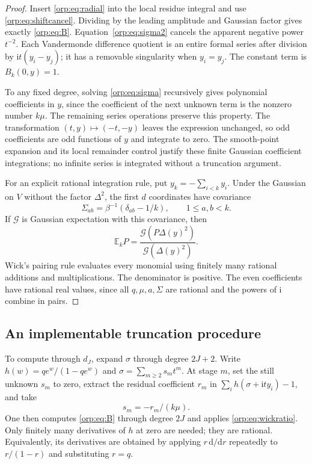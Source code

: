 \documentclass[11pt]{article}
\theoremstyle{remark}\newtheorem{remark}[theorem]{Remark}
\newcommand{\E}{\mathbb E}
\newcommand{\ii}{\mathrm i}
\begin{document}
\begin{proof}
Insert \eqref{orp:eq:radial} into the local residue integral and use \eqref{orp:eq:shiftcancel}. Dividing by the leading amplitude and Gaussian factor gives exactly \eqref{orp:eq:B}. Equation~\eqref{orp:eq:sigma2} cancels the apparent negative power $t^{-2}$. Each Vandermonde difference quotient is an entire formal series after division by $\ii t(y_i-y_j)$; it has a removable singularity when $y_i=y_j$. The constant term is $B_k(0,y)=1$.

To any fixed degree, solving \eqref{orp:eq:sigma} recursively gives polynomial coefficients in $y$, since the coefficient of the next unknown term is the nonzero number $k\mu$. The remaining series operations preserve this property. The transformation $(t,y)\mapsto(-t,-y)$ leaves the expression unchanged, so odd coefficients are odd functions of $y$ and integrate to zero. The smooth-point expansion and its local remainder control justify these finite Gaussian coefficient integrations; no infinite series is integrated without a truncation argument.

For an explicit rational integration rule, put $y_k=-\sum_{i<k}y_i$. Under the Gaussian on $V$ without the factor $\Delta^2$, the first $d$ coordinates have covariance
\begin{equation}\label{orp:eq:cov}
 \Sigma_{ab}=\beta^{-1}(\delta_{ab}-1/k),\qquad 1\le a,b<k.
\end{equation}
If $\mathcal G$ is Gaussian expectation with this covariance, then
\begin{equation}\label{orp:eq:wickratio}
 \E_k P=\frac{\mathcal G(P\Delta(y)^2)}{\mathcal G(\Delta(y)^2)}.
\end{equation}
Wick's pairing rule evaluates every monomial using finitely many rational additions and multiplications. The denominator is positive. The even coefficients have rational real values, since all $q,\mu,a,\Sigma$ are rational and the powers of $\ii$ combine in pairs.
\end{proof}

\subsection{An implementable truncation procedure}
To compute through $d_J$, expand $\sigma$ through degree $2J+2$. Write $h(w)=qe^w/(1-qe^w)$ and $\sigma=\sum_{m\ge2}s_m t^m$. At stage $m$, set the still unknown $s_m$ to zero, extract the residual coefficient $r_m$ in $\sum_i h(\sigma+\ii t y_i)-1$, and take
\[
 s_m=-r_m/(k\mu).
\]
One then computes \eqref{orp:eq:B} through degree $2J$ and applies \eqref{orp:eq:wickratio}. Only finitely many derivatives of $h$ at zero are needed; they are rational. Equivalently, its derivatives are obtained by applying $r\,\mathrm d/\mathrm dr$ repeatedly to $r/(1-r)$ and substituting $r=q$.
\end{document}
